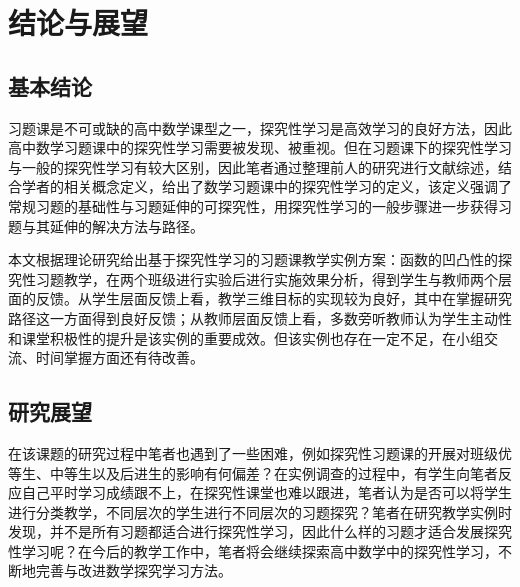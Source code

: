 \chapter{结论与展望}

\section{基本结论}

习题课是不可或缺的高中数学课型之一，探究性学习是高效学习的良好方法，因此高中数学习题课中的探究性学习需要被发现、被重视。但在习题课下的探究性学习与一般的探究性学习有较大区别，因此笔者通过整理前人的研究进行文献综述，结合学者的相关概念定义，给出了数学习题课中的探究性学习的定义，该定义强调了常规习题的基础性与习题延伸的可探究性，用探究性学习的一般步骤进一步获得习题与其延伸的解决方法与路径。

本文根据理论研究给出基于探究性学习的习题课教学实例方案：函数的凹凸性的探究性习题教学，在两个班级进行实验后进行实施效果分析，得到学生与教师两个层面的反馈。从学生层面反馈上看，教学三维目标的实现较为良好，其中在掌握研究路径这一方面得到良好反馈；从教师层面反馈上看，多数旁听教师认为学生主动性和课堂积极性的提升是该实例的重要成效。但该实例也存在一定不足，在小组交流、时间掌握方面还有待改善。



\section{研究展望}

在该课题的研究过程中笔者也遇到了一些困难，例如探究性习题课的开展对班级优等生、中等生以及后进生的影响有何偏差？在实例调查的过程中，有学生向笔者反应自己平时学习成绩跟不上，在探究性课堂也难以跟进，笔者认为是否可以将学生进行分类教学，不同层次的学生进行不同层次的习题探究？笔者在研究教学实例时发现，并不是所有习题都适合进行探究性学习，因此什么样的习题才适合发展探究性学习呢？在今后的教学工作中，笔者将会继续探索高中数学中的探究性学习，不断地完善与改进数学探究学习方法。